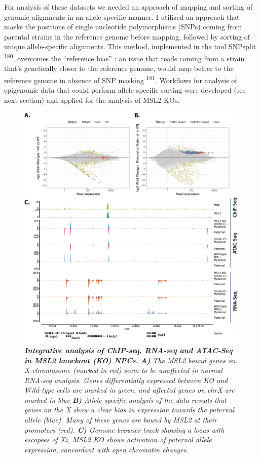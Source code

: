 \documentclass[11pt,twoside]{MPIthesis}
\theoremstyle{definition}
\theoremstyle{definition}
\theoremstyle{definition}
\theoremstyle{remark}
\begin{document}
For analysis of these datasets we needed an approach of mapping and
sorting of genomic alignments in an allele-specific manner. I utilized
an approach that masks the positions of single nucleotide polymorphisms
(SNPs) coming from parental strains in the reference genome before
mapping, followed by sorting of unique allele-specific alignments. This
method, implemented in the tool SNPsplit \textsuperscript{180},
overcomes the ``reference bias'' : an issue that reads coming from a
strain that's genetically closer to the reference genome, would map
better to the reference genome in absence of SNP masking
\textsuperscript{181}. Workflows for analysis of epigenomic data that
could perform allele-specific sorting were developed (see next section)
and applied for the analysis of MSL2 KOs.
\begin{figure}

{\centering \includegraphics[width=1\linewidth,height=0.7\textheight]{figures/results_fig7} 

}

\caption[Integrative analysis of ChIP-seq, RNA-seq and ATAC-Seq in MSL2 knockout (KO) NPCs]{\emph{\textbf{Integrative analysis of ChIP-seq, RNA-seq and
ATAC-Seq in MSL2 knockout (KO) NPCs.} \textbf{A)} The MSL2 bound genes
on X-chromosome (marked in red) seem to be unaffected in normal RNA-seq
analysis. Genes differentially expressed between KO and Wild-type cells
are marked in green, and affected genes on chrX are marked in blue
\textbf{B)} Allele-specific analysis of the data reveals that genes on
the X show a clear bias in expression towards the paternal allele
(blue). Many of these genes are bound by MSL2 at their promoters (red).
\textbf{C)} Genome browser track showing a locus with escapees of Xi,
MSL2 KO shows activation of paternal allele expression, concordant with
open chromatin changes.}}\label{fig:unnamed-chunk-12}
\end{figure}
\end{document}

